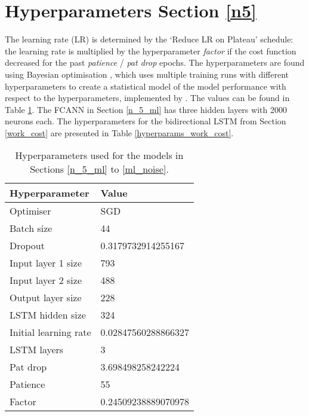 \section{Hyperparameters Section \ref{n5}}
The learning rate (LR) is determined by the `Reduce LR on Plateau' schedule:
the learning rate is multiplied by the hyperparameter \textit{factor} if the cost function decreased for the past \textit{patience} / \textit{pat drop} epochs.
The hyperparameters are found using Bayesian optimisation \cite{10.5555/2999325.2999464}, which uses multiple training runs with different hyperparameters to create a statistical model of the model performance with respect to the hyperparameters, implemented by \cite{wandb}.
The values can be found in Table \ref{hyperparams_n_5}.
The FCANN in Section \ref{n_5_ml} has three hidden layers with 2000 neurons each.
The hyperparameters for the bidirectional LSTM from Section \ref{work_cost} are presented in Table \ref{hyperparams_work_cost}.

\begin{table}[h]
	\centering
	\begin{tabular}{l | l}
		Hyperparameter & Value \\
		\hline
		Optimiser & SGD \\
		Batch size & 44 \\
		Dropout & 0.3179732914255167 \\
		Input layer 1 size & 793 \\
		Input layer 2 size & 488 \\
		Output layer size & 228 \\
		LSTM hidden size & 324 \\
		Initial learning rate & 0.02847560288866327 \\
		LSTM layers & 3 \\
		Pat drop & 3.698498258242224 \\
		Patience & 55 \\
		Factor & 0.24509238889070978
	\end{tabular}
	\caption{Hyperparameters used for the models in Sections \ref{n_5_ml} to \ref{ml_noise}.}
	\label{hyperparams_n_5}
\end{table}

